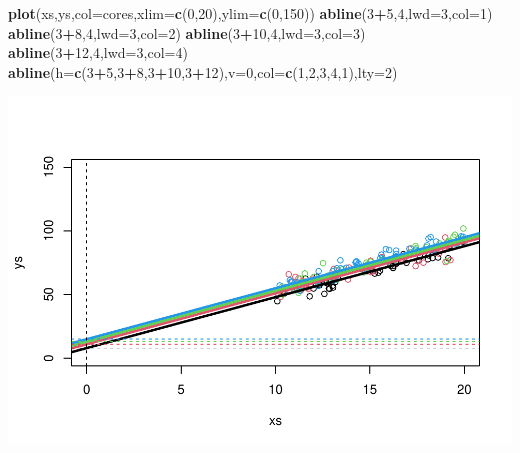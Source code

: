 \documentclass[
]{book}
\newenvironment{Shaded}{\begin{snugshade}}{\end{snugshade}}
\newcommand{\DataTypeTok}[1]{\textcolor[rgb]{0.13,0.29,0.53}{#1}}
\newcommand{\DecValTok}[1]{\textcolor[rgb]{0.00,0.00,0.81}{#1}}
\newcommand{\KeywordTok}[1]{\textcolor[rgb]{0.13,0.29,0.53}{\textbf{#1}}}
\newcommand{\NormalTok}[1]{#1}
\newcommand{\OperatorTok}[1]{\textcolor[rgb]{0.81,0.36,0.00}{\textbf{#1}}}
\begin{document}
\begin{Shaded}
\begin{Highlighting}[]
\KeywordTok{plot}\NormalTok{(xs,ys,}\DataTypeTok{col=}\NormalTok{cores,}\DataTypeTok{xlim=}\KeywordTok{c}\NormalTok{(}\DecValTok{0}\NormalTok{,}\DecValTok{20}\NormalTok{),}\DataTypeTok{ylim=}\KeywordTok{c}\NormalTok{(}\DecValTok{0}\NormalTok{,}\DecValTok{150}\NormalTok{))}
\KeywordTok{abline}\NormalTok{(}\DecValTok{3}\OperatorTok{+}\DecValTok{5}\NormalTok{,}\DecValTok{4}\NormalTok{,}\DataTypeTok{lwd=}\DecValTok{3}\NormalTok{,}\DataTypeTok{col=}\DecValTok{1}\NormalTok{)}
\KeywordTok{abline}\NormalTok{(}\DecValTok{3}\OperatorTok{+}\DecValTok{8}\NormalTok{,}\DecValTok{4}\NormalTok{,}\DataTypeTok{lwd=}\DecValTok{3}\NormalTok{,}\DataTypeTok{col=}\DecValTok{2}\NormalTok{)}
\KeywordTok{abline}\NormalTok{(}\DecValTok{3}\OperatorTok{+}\DecValTok{10}\NormalTok{,}\DecValTok{4}\NormalTok{,}\DataTypeTok{lwd=}\DecValTok{3}\NormalTok{,}\DataTypeTok{col=}\DecValTok{3}\NormalTok{)}
\KeywordTok{abline}\NormalTok{(}\DecValTok{3}\OperatorTok{+}\DecValTok{12}\NormalTok{,}\DecValTok{4}\NormalTok{,}\DataTypeTok{lwd=}\DecValTok{3}\NormalTok{,}\DataTypeTok{col=}\DecValTok{4}\NormalTok{)}
\KeywordTok{abline}\NormalTok{(}\DataTypeTok{h=}\KeywordTok{c}\NormalTok{(}\DecValTok{3}\OperatorTok{+}\DecValTok{5}\NormalTok{,}\DecValTok{3}\OperatorTok{+}\DecValTok{8}\NormalTok{,}\DecValTok{3}\OperatorTok{+}\DecValTok{10}\NormalTok{,}\DecValTok{3}\OperatorTok{+}\DecValTok{12}\NormalTok{),}\DataTypeTok{v=}\DecValTok{0}\NormalTok{,}\DataTypeTok{col=}\KeywordTok{c}\NormalTok{(}\DecValTok{1}\NormalTok{,}\DecValTok{2}\NormalTok{,}\DecValTok{3}\NormalTok{,}\DecValTok{4}\NormalTok{,}\DecValTok{1}\NormalTok{),}\DataTypeTok{lty=}\DecValTok{2}\NormalTok{)}
\end{Highlighting}
\end{Shaded}

\includegraphics{ECOMODbook_files/figure-latex/a9.3-1.pdf}
\end{document}
